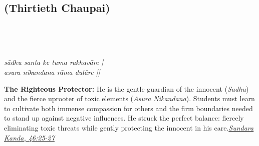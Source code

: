 
\newpage

\subsection*{ (Thirtieth Chaupai)}

\begin{minipage}[t]{0.55\textwidth}
\vspace{0pt}

{\large \linespread{1.5}\selectfont
{}\\
\par}

\vspace{0.5em}

{\large \linespread{1.5}\selectfont
{}\\
\par}

\vspace{0.5em}

{\large \linespread{1.3}\selectfont
\textit{sādhu santa ke tuma rakhavāre |}\\
\textit{asura nikandana rāma dulāre ||}
\par}
\end{minipage}%
\hfill
\begin{minipage}[t]{0.42\textwidth}
\vspace{0pt}
\begin{tcolorbox}[anchorbox]
\textbf{The Righteous Protector:} He is the gentle guardian of the innocent (\textit{Sadhu}) and the fierce uprooter of toxic elements (\textit{Asura Nikandana}). Students must learn to cultivate both immense compassion for others and the firm boundaries needed to stand up against negative influences.
\vspace{0.5em}\newline He struck the perfect balance: fiercely eliminating toxic threats while gently protecting the innocent in his care.\newline\null\hfill\href{https://www.valmiki.iitk.ac.in/sloka?field_kanda_tid=5&language=dv&field_sarga_value=46}{\textit{Sundara Kanda, 46:25-27}}
\end{tcolorbox}
\end{minipage}

